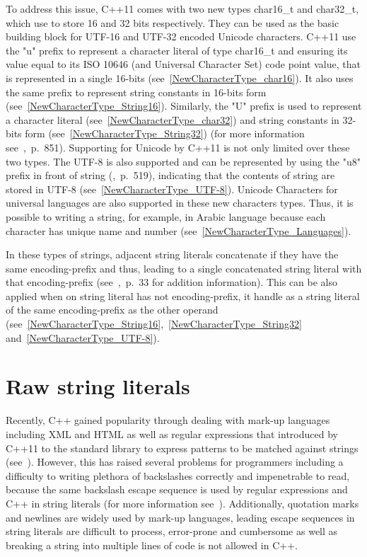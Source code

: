 \documentclass[11pt]{report}
\begin{document}
To address this issue, C++11 comes with two new types char16\_t and char32\_t, which use to store 16 and 32 bits respectively. They can be used as the basic building block for UTF-16 and UTF-32 encoded Unicode characters. C++11 use the "u" prefix to represent a character literal of type char16\_t and ensuring its value equal to its ISO 10646 (and Universal Character Set) code point value, that is represented in a single 16-bits (see~\ref{NewCharacterType_char16}). It also uses the same prefix to represent string constants in 16-bits form (see~\ref{NewCharacterType_String16}). Similarly, the "U" prefix is used to represent a character literal (see~\ref{NewCharacterType_char32}) and string constants in 32-bits form (see~\ref{NewCharacterType_String32}) (for more information see~\cite{Josuttis:2012:CppStandard},~p.~851). Supporting for Unicode by C++11 is not only limited over these two types. The UTF-8 is also supported and can be represented by using the "u8" prefix in front of string (\cite{Gregorie:professionalcpp},~p.~519), indicating that the contents of string are stored in UTF-8 (see~\ref{NewCharacterType_UTF-8}). Unicode Characters for universal languages are also supported in these new characters types. Thus, it is possible to writing a string, for example, in Arabic language because each character has unique name and number (see~\ref{NewCharacterType_Languages}).

In these types of strings, adjacent string literals concatenate if they have the same encoding-prefix and thus, leading to a single concatenated string literal with that encoding-prefix (see~\cite{ ISO:2011:Cpplanguage},~p.~33 for addition information). This can be also applied when on string literal has not encoding-prefix, it handle as a string literal of the same encoding-prefix as the other operand (see~\ref{NewCharacterType_String16},~\ref{NewCharacterType_String32} and~\ref{NewCharacterType_UTF-8}).


\section{Raw string literals}
\label{section: Raw string literals}
Recently, C++ gained popularity through dealing with mark-up languages including XML and HTML as well as regular expressions that introduced by C++11 to the standard library to express patterns to be matched against strings (see~\cite{Stroustrup:2012:Cpp11}). However, this has raised several problems for programmers including a difficulty to writing plethora of backslashes correctly and impenetrable to read, because the same backslash escape sequence is used by regular expressions and C++ in string literals (for more information see~\cite{Stroustrup:2012:Cpp11}). Additionally, quotation marks and newlines are widely used by mark-up languages, leading escape sequences in string literals are difficult to process, error-prone and cumbersome as well as breaking a string into multiple lines of code is not allowed in C++.
\end{document}
